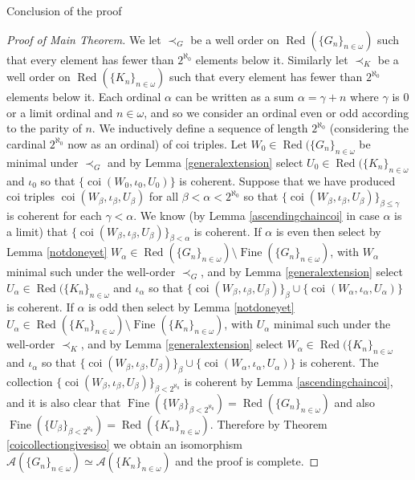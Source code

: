 \documentclass{amsart}
\theoremstyle{definition}\newtheorem{theorem}{Theorem}
\theoremstyle{definition}\newtheorem*{A}{Main Theorem}
\theoremstyle{definition}\newtheorem*{B}{Theorem \ref{elementaryequiv}}
\theoremstyle{definition}\newtheorem*{C}{Theorem \ref{continuous}}
\theoremstyle{definition}\newtheorem*{D}{Theorem \ref{bigisomorphism2}}
\theoremstyle{definition}\newtheorem{bigtheorem}{Main Theorem}
\numberwithin{theorem}{section}
\theoremstyle{definition}\newtheorem{corollary}[theorem]{Corollary}
\theoremstyle{definition}\newtheorem{proposition}[theorem]{Proposition}
\theoremstyle{definition}\newtheorem{definition}[theorem]{Definition}
\theoremstyle{definition}\newtheorem{question}[theorem]{Question}
\theoremstyle{definition}\newtheorem{example}[theorem]{Example}
\theoremstyle{definition}\newtheorem{remark}[theorem]{Remark}
\theoremstyle{definition}\newtheorem{note}[theorem]{Note}
\theoremstyle{definition}\newtheorem{lemma}[theorem]{Lemma}
\theoremstyle{definition}\newtheorem{fact}[theorem]{Fact}
\theoremstyle{definition}\newtheorem{define}[theorem]{Definition}
\theoremstyle{definition}\newtheorem{claim}[theorem]{Claim}
\theoremstyle{definition}\newtheorem{obs}[theorem]{Observation}
\theoremstyle{definition}\newtheorem{definitions}[theorem]{Definitions}
\newcommand{\Red}{\operatorname{Red}}
\newcommand{\Fine}{\operatorname{Fine}}
\newcommand{\coi}{\operatorname{coi}}
\begin{document}
\begin{section}{Conclusion of the proof}
\begin{proof}[Proof of Main Theorem]
We let $\prec_G$ be a well order on $\Red(\{G_n\}_{n \in \omega})$ such that every element has fewer than $2^{\aleph_0}$ elements below it.  Similarly let $\prec_K$ be a well order on $\Red(\{K_n\}_{n \in \omega})$ such that every element has fewer than $2^{\aleph_0}$ elements below it.  Each ordinal $\alpha$ can be written as a sum $\alpha = \gamma + n$ where $\gamma$ is $0$ or a limit ordinal and $n \in \omega$, and so we consider an ordinal even or odd according to the parity of $n$.  We inductively define a sequence of length $2^{\aleph_0}$ (considering the cardinal $2^{\aleph_0}$ now as an ordinal) of coi triples.  Let $W_0 \in \Red(\{G_n\}_{n \in \omega}$ be minimal under $\prec_G$ and by Lemma \ref{generalextension} select $U_0 \in \Red(\{K_n\}_{n \in \omega}$ and $\iota_0$ so that $\{\coi(W_0, \iota_0, U_0)\}$ is coherent.  Suppose that we have produced coi triples $\coi(W_{\beta}, \iota_{\beta}, U_{\beta})$ for all $\beta < \alpha < 2^{\aleph_0}$ so that $\{\coi(W_{\beta}, \iota_{\beta}, U_{\beta})\}_{\beta \leq \gamma}$ is coherent for each $\gamma < \alpha$.  We know (by Lemma \ref{ascendingchaincoi} in case $\alpha$ is a limit) that $\{\coi(W_{\beta}, \iota_{\beta}, U_{\beta})\}_{\beta < \alpha}$ is coherent.  If $\alpha$ is even then select by Lemma \ref{notdoneyet} $W_{\alpha} \in \Red(\{G_n\}_{n \in \omega}) \setminus \Fine(\{G_n\}_{n \in \omega})$, with $W_{\alpha}$ minimal such under the well-order $\prec_G$, and by Lemma \ref{generalextension} select $U_{\alpha} \in \Red(\{K_n\}_{n \in \omega}$ and $\iota_{\alpha}$ so that $\{\coi(W_{\beta}, \iota_{\beta}, U_{\beta})\}_{\beta} \cup \{\coi(W_{\alpha}, \iota_{\alpha}, U_{\alpha})\}$ is coherent.  If $\alpha$ is odd then select by Lemma \ref{notdoneyet} $U_{\alpha} \in \Red(\{K_n\}_{n \in \omega}) \setminus \Fine(\{K_n\}_{n \in \omega})$, with $U_{\alpha}$ minimal such under the well-order $\prec_K$, and by Lemma \ref{generalextension} select $W_{\alpha} \in \Red(\{K_n\}_{n \in \omega}$ and $\iota_{\alpha}$ so that $\{\coi(W_{\beta}, \iota_{\beta}, U_{\beta})\}_{\beta} \cup \{\coi(W_{\alpha}, \iota_{\alpha}, U_{\alpha})\}$ is coherent.  The collection $\{\coi(W_{\beta}, \iota_{\beta}, U_{\beta})\}_{\beta < 2^{\aleph_0}}$ is coherent by Lemma \ref{ascendingchaincoi}, and it is also clear that $\Fine(\{W_{\beta}\}_{\beta < 2^{\aleph_0}}) = \Red(\{G_n\}_{n \in \omega})$ and also $\Fine(\{U_{\beta}\}_{\beta < 2^{\aleph_0}}) = \Red(\{K_n\}_{n \in \omega})$.  Therefore by Theorem \ref{coicollectiongivesiso} we obtain an isomorphism $\mathcal{A}(\{G_n\}_{n \in \omega}) \simeq \mathcal{A}(\{K_n\}_{n \in \omega})$ and the proof is complete.
\end{proof}


\end{section}
\end{document}
